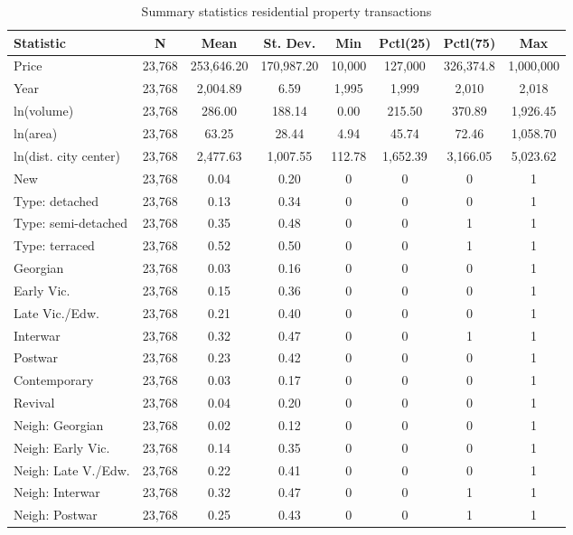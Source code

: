 \documentclass[]{article}
\begin{document}
\begin{table}[!htbp] \centering 
  \caption{Summary statistics residential property transactions} 
  \label{tab:sumstats} 
\begin{tabular}{@{\extracolsep{5pt}}lccccccc} 
\toprule
Statistic & \multicolumn{1}{c}{N} & \multicolumn{1}{c}{Mean} & \multicolumn{1}{c}{St. Dev.} & \multicolumn{1}{c}{Min} & \multicolumn{1}{c}{Pctl(25)} & \multicolumn{1}{c}{Pctl(75)} & \multicolumn{1}{c}{Max} \\ 
\midrule
Price & 23,768 & 253,646.20 & 170,987.20 & 10,000 & 127,000 & 326,374.8 & 1,000,000 \\ 
Year & 23,768 & 2,004.89 & 6.59 & 1,995 & 1,999 & 2,010 & 2,018 \\ 
ln(volume) & 23,768 & 286.00 & 188.14 & 0.00 & 215.50 & 370.89 & 1,926.45 \\ 
ln(area) & 23,768 & 63.25 & 28.44 & 4.94 & 45.74 & 72.46 & 1,058.70 \\ 
ln(dist. city center) & 23,768 & 2,477.63 & 1,007.55 & 112.78 & 1,652.39 & 3,166.05 & 5,023.62 \\ 
New & 23,768 & 0.04 & 0.20 & 0 & 0 & 0 & 1 \\ 
Type: detached & 23,768 & 0.13 & 0.34 & 0 & 0 & 0 & 1 \\ 
Type: semi-detached & 23,768 & 0.35 & 0.48 & 0 & 0 & 1 & 1 \\ 
Type: terraced & 23,768 & 0.52 & 0.50 & 0 & 0 & 1 & 1 \\ 
Georgian & 23,768 & 0.03 & 0.16 & 0 & 0 & 0 & 1 \\ 
Early Vic. & 23,768 & 0.15 & 0.36 & 0 & 0 & 0 & 1 \\ 
Late Vic./Edw. & 23,768 & 0.21 & 0.40 & 0 & 0 & 0 & 1 \\ 
Interwar & 23,768 & 0.32 & 0.47 & 0 & 0 & 1 & 1 \\ 
Postwar & 23,768 & 0.23 & 0.42 & 0 & 0 & 0 & 1 \\ 
Contemporary & 23,768 & 0.03 & 0.17 & 0 & 0 & 0 & 1 \\ 
Revival & 23,768 & 0.04 & 0.20 & 0 & 0 & 0 & 1 \\ 
Neigh: Georgian & 23,768 & 0.02 & 0.12 & 0 & 0 & 0 & 1 \\ 
Neigh: Early Vic. & 23,768 & 0.14 & 0.35 & 0 & 0 & 0 & 1 \\ 
Neigh: Late V./Edw. & 23,768 & 0.22 & 0.41 & 0 & 0 & 0 & 1 \\ 
Neigh: Interwar & 23,768 & 0.32 & 0.47 & 0 & 0 & 1 & 1 \\ 
Neigh: Postwar & 23,768 & 0.25 & 0.43 & 0 & 0 & 1 & 1 \\ 

\end{tabular}
\end{table}
\end{document}
